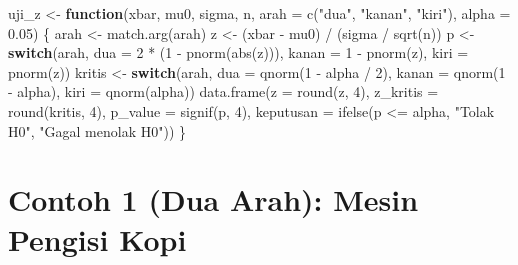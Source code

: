 \documentclass[
  indonesian,
  letterpaper,
]{book}
\newenvironment{Shaded}{\begin{snugshade}}{\end{snugshade}}
\newcommand{\AttributeTok}[1]{\textcolor[rgb]{0.40,0.45,0.13}{#1}}
\newcommand{\ControlFlowTok}[1]{\textcolor[rgb]{0.00,0.23,0.31}{\textbf{#1}}}
\newcommand{\DecValTok}[1]{\textcolor[rgb]{0.68,0.00,0.00}{#1}}
\newcommand{\FloatTok}[1]{\textcolor[rgb]{0.68,0.00,0.00}{#1}}
\newcommand{\FunctionTok}[1]{\textcolor[rgb]{0.28,0.35,0.67}{#1}}
\newcommand{\NormalTok}[1]{\textcolor[rgb]{0.00,0.23,0.31}{#1}}
\newcommand{\OtherTok}[1]{\textcolor[rgb]{0.00,0.23,0.31}{#1}}
\newcommand{\SpecialCharTok}[1]{\textcolor[rgb]{0.37,0.37,0.37}{#1}}
\newcommand{\StringTok}[1]{\textcolor[rgb]{0.13,0.47,0.30}{#1}}
\begin{document}
\begin{Shaded}
\begin{Highlighting}[]
\NormalTok{uji\_z }\OtherTok{\textless{}{-}} \ControlFlowTok{function}\NormalTok{(xbar, mu0, sigma, n, }\AttributeTok{arah =} \FunctionTok{c}\NormalTok{(}\StringTok{"dua"}\NormalTok{, }\StringTok{"kanan"}\NormalTok{, }\StringTok{"kiri"}\NormalTok{), }\AttributeTok{alpha =} \FloatTok{0.05}\NormalTok{) \{}
\NormalTok{  arah }\OtherTok{\textless{}{-}} \FunctionTok{match.arg}\NormalTok{(arah)}
\NormalTok{  z }\OtherTok{\textless{}{-}}\NormalTok{ (xbar }\SpecialCharTok{{-}}\NormalTok{ mu0) }\SpecialCharTok{/}\NormalTok{ (sigma }\SpecialCharTok{/} \FunctionTok{sqrt}\NormalTok{(n))}
\NormalTok{  p }\OtherTok{\textless{}{-}} \ControlFlowTok{switch}\NormalTok{(arah,}
              \AttributeTok{dua   =} \DecValTok{2} \SpecialCharTok{*}\NormalTok{ (}\DecValTok{1} \SpecialCharTok{{-}} \FunctionTok{pnorm}\NormalTok{(}\FunctionTok{abs}\NormalTok{(z))),}
              \AttributeTok{kanan =} \DecValTok{1} \SpecialCharTok{{-}} \FunctionTok{pnorm}\NormalTok{(z),}
              \AttributeTok{kiri  =} \FunctionTok{pnorm}\NormalTok{(z))}
\NormalTok{  kritis }\OtherTok{\textless{}{-}} \ControlFlowTok{switch}\NormalTok{(arah,}
                   \AttributeTok{dua   =} \FunctionTok{qnorm}\NormalTok{(}\DecValTok{1} \SpecialCharTok{{-}}\NormalTok{ alpha }\SpecialCharTok{/} \DecValTok{2}\NormalTok{),}
                   \AttributeTok{kanan =} \FunctionTok{qnorm}\NormalTok{(}\DecValTok{1} \SpecialCharTok{{-}}\NormalTok{ alpha),}
                   \AttributeTok{kiri  =} \FunctionTok{qnorm}\NormalTok{(alpha))}
  \FunctionTok{data.frame}\NormalTok{(}\AttributeTok{z =} \FunctionTok{round}\NormalTok{(z, }\DecValTok{4}\NormalTok{), }\AttributeTok{z\_kritis =} \FunctionTok{round}\NormalTok{(kritis, }\DecValTok{4}\NormalTok{), }\AttributeTok{p\_value =} \FunctionTok{signif}\NormalTok{(p, }\DecValTok{4}\NormalTok{),}
             \AttributeTok{keputusan =} \FunctionTok{ifelse}\NormalTok{(p }\SpecialCharTok{\textless{}=}\NormalTok{ alpha, }\StringTok{"Tolak H0"}\NormalTok{, }\StringTok{"Gagal menolak H0"}\NormalTok{))}
\NormalTok{\}}
\end{Highlighting}
\end{Shaded}

\section{Contoh 1 (Dua Arah): Mesin Pengisi
Kopi}\label{contoh-1-dua-arah-mesin-pengisi-kopi}
\end{document}
